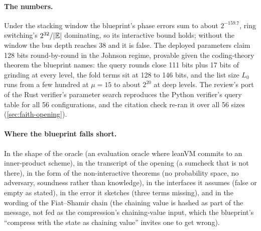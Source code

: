 \paragraph{The numbers.} Under the stacking window the blueprint's phase errors sum to about
$2^{-159.7}$, ring switching's $2^{32}/\lvert \mathbb{E}\rvert$ dominating, so its interactive bound holds;
without the window the bus depth reaches 38 and it is false. The deployed parameters claim 128
bits round-by-round in the Johnson regime, provable given the coding-theory theorem the
blueprint names: the query rounds close 111 bits plus 17 bits of grinding at every level, the
fold terms sit at 128 to 146 bits, and the list size $L_0$ runs from a few hundred at
$\mu = 15$ to about $2^{20}$ at deep levels. The review's port of the Rust verifier's parameter search
reproduces the Python verifier's query table for all 56 configurations, and the citation check re-ran it over all 56 sizes
(\cref{sec:faith-opening}).

\paragraph{Where the blueprint falls short.} In the shape of the oracle (an evaluation oracle
where leanVM commits to an inner-product scheme), in the transcript of the opening (a sumcheck
that is not there), in the form of the non-interactive theorems (no probability space, no
adversary, soundness rather than knowledge), in the interfaces it assumes (false or empty as
stated), in the error it sketches (three terms missing), and in the wording of the
Fiat--Shamir chain (the chaining value is hashed as part of the message, not fed as the
compression's chaining-value input, which the blueprint's \enquote{compress with the state as
chaining value} invites one to get wrong).
